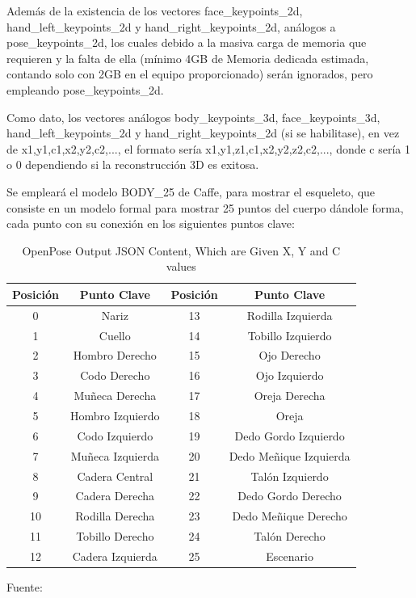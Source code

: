 Además de la existencia de los vectores face\_keypoints\_2d, hand\_left\_keypoints\_2d y hand\_right\_keypoints\_2d, análogos a pose\_keypoints\_2d, los cuales debido a la masiva carga de memoria que requieren y la falta de ella (mínimo 4GB de Memoria dedicada estimada, contando solo con 2GB en el equipo proporcionado) serán ignorados, pero empleando pose\_keypoints\_2d.

Como dato, los vectores análogos body\_keypoints\_3d, face\_keypoints\_3d,
hand\_left\_keypoints\_2d y hand\_right\_keypoints\_2d (si se habilitase), en vez de 
x1,y1,c1,x2,y2,c2,..., el formato sería x1,y1,z1,c1,x2,y2,z2,c2,..., donde c sería 1 o 0 dependiendo si la reconstrucción 3D es exitosa.

Se empleará el modelo BODY\_25 de Caffe, para mostrar el esqueleto, que consiste en un modelo formal para mostrar 25 puntos del cuerpo dándole forma, cada punto con su conexión en los siguientes puntos clave:

\begin{table}[t]
	\begin{center}
		\begin{tabular}{| c | c | c | c | }
			\hline Posición & Punto Clave & Posición & Punto Clave \\ \hline
			0 & Nariz&13 & Rodilla Izquierda \\ \hline
			1 & Cuello &14 & Tobillo Izquierdo \\ \hline
			2 & Hombro Derecho & 15 & Ojo Derecho \\ \hline
			3 & Codo Derecho & 16 & Ojo Izquierdo \\ \hline
			4 & Muñeca Derecha & 17 & Oreja Derecha \\ \hline
			5 & Hombro Izquierdo & 18 & Oreja \\ \hline
			6 & Codo Izquierdo & 19 & Dedo Gordo Izquierdo \\ \hline
			7 & Muñeca Izquierda & 20 & Dedo Meñique Izquierda \\ \hline
			8 & Cadera Central & 21 & Talón Izquierdo \\ \hline
			9 & Cadera Derecha & 22 & Dedo Gordo Derecho \\ \hline
			10 & Rodilla Derecha & 23 & Dedo Meñique Derecho\\ \hline
			11 & Tobillo Derecho & 24 & Talón Derecho \\ \hline
			12 & Cadera Izquierda & 25 & Escenario \\ \hline
		\end{tabular}
		\caption{OpenPose Output JSON Content, Which are Given X, Y and C values}
		\footnotesize Fuente:\cite{8765346}
	\end{center}
\end{table}


